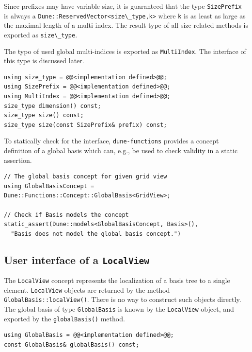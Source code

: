 \documentclass[a4paper,10pt,headings=normal,bibliography=totoc]{scrartcl}
\newcommand{\cpp}[1]{\lstinline[basicstyle=\ttfamily]!#1!}
\newcommand{\dunemodule}[1]{\texttt{#1}}
\begin{document}
Since prefixes may have variable size, it is guaranteed that the type \cpp{SizePrefix}
is always a \cpp{Dune::ReservedVector<size\_type,k>} where \cpp{k}
is as least as large as the maximal length of a multi-index. The result
type of all size-related methods is exported as \cpp{size\_type}.

The typo of used global multi-indices is exported as \cpp{MultiIndex}.
The interface of this type is discussed later.

\begin{lstlisting}[style=Interface]
using size_type = @@<implementation defined>@@;
using SizePrefix = @@<implementation defined>@@;
using MultiIndex = @@<implementation defined>@@;
size_type dimension() const;
size_type size() const;
size_type size(const SizePrefix& prefix) const;
\end{lstlisting}



To statically check for the interface,
\dunemodule{dune-functions} provides a concept definition of a global
basis which can, e.g., be used to check validity in a static assertion.

\begin{lstlisting}[style=Example]
// The global basis concept for given grid view
using GlobalBasisConcept = Dune::Functions::Concept::GlobalBasis<GridView>;

// Check if Basis models the concept
static_assert(Dune::models<GlobalBasisConcept, Basis>(),
  "Basis does not model the global basis concept.")
\end{lstlisting}

\subsection{User interface of a \texorpdfstring{\cpp{LocalView}}{LocalView}}

The \cpp{LocalView} concept represents the localization of a basis tree to a single element.
\cpp{LocalView} objects are returned by the method \cpp{GlobalBasis::localView()}.
There is no way to construct such objects directly.
The global basis of type \cpp{GlobalBasis}
is known by the \cpp{LocalView} object, and exported by the \cpp{globalBasis()} method.
\begin{lstlisting}[style=Interface]
using GlobalBasis = @@<implementation defined>@@;
const GlobalBasis& globalBasis() const;
\end{lstlisting}
\end{document}
